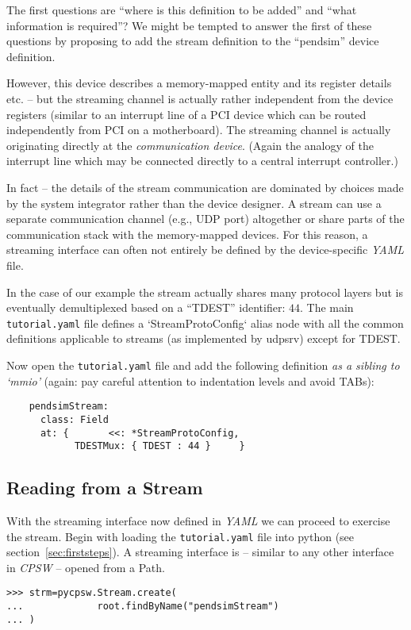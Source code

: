 \documentclass[10pt]{article}
\newcommand{\ita}[1]{\emph{#1}}
\newcommand{\cpsw}      {\ita {CPSW}}
\newcommand{\yaml}      {\ita {YAML}}
\newcommand{\Path}      {{Path}}
\newcommand{\py}        {python}
\newcommand{\udps}      {udpsrv}
\newcommand{\cod}[1] {{\tt#1}}
\newcommand{\tutyaml} {\cod{tutorial.yaml}}
\begin{document}
The first questions are ``where is this definition to be added'' and ``what
information is required''? We might be tempted to answer the first of these questions
by proposing to add the stream definition to the ``pendsim'' device definition.

However, this device describes a memory-mapped entity and its register details
etc. -- but the streaming channel is actually rather independent from the device
registers (similar to an interrupt line of a PCI device which can be routed
independently from PCI on a motherboard). The streaming channel is actually
originating directly at the {\em communication device}. (Again the analogy of
the interrupt line which may be connected directly to a central interrupt controller.)

In fact -- the details of the stream communication are dominated by choices made
by the system integrator rather than the device designer. A stream can use a separate
communication channel (e.g., UDP port) altogether or share parts of the communication
stack with the memory-mapped devices. For this reason, a streaming interface can
often not entirely be defined by the device-specific \yaml{} file.

In the case of our example the stream actually shares many protocol layers but
is eventually demultiplexed based on a ``TDEST'' identifier: $44$. The main \tutyaml{}
file defines a `StreamProtoConfig` alias node with all the common definitions
applicable to streams (as implemented by \udps{}) except for TDEST.

Now open the \tutyaml{} file and add the following definition {\em as a sibling to
`mmio'} (again: pay careful attention to indentation levels and avoid TABs):
\begin{verbatim}
    pendsimStream:
      class: Field
      at: {       <<: *StreamProtoConfig,
            TDESTMux: { TDEST : 44 }     }
\end{verbatim}

\subsection{Reading from a Stream}
With the streaming interface now defined in \yaml{} we can proceed to exercise
the stream.  Begin with loading the \tutyaml{} file into \py{} (see
section~\ref{sec:firststeps}).  A streaming interface is -- similar to any other interface
in \cpsw{} -- opened from a \Path{}.
\begin{verbatim}
>>> strm=pycpsw.Stream.create(
...             root.findByName("pendsimStream")
... )
\end{verbatim}
\end{document}
